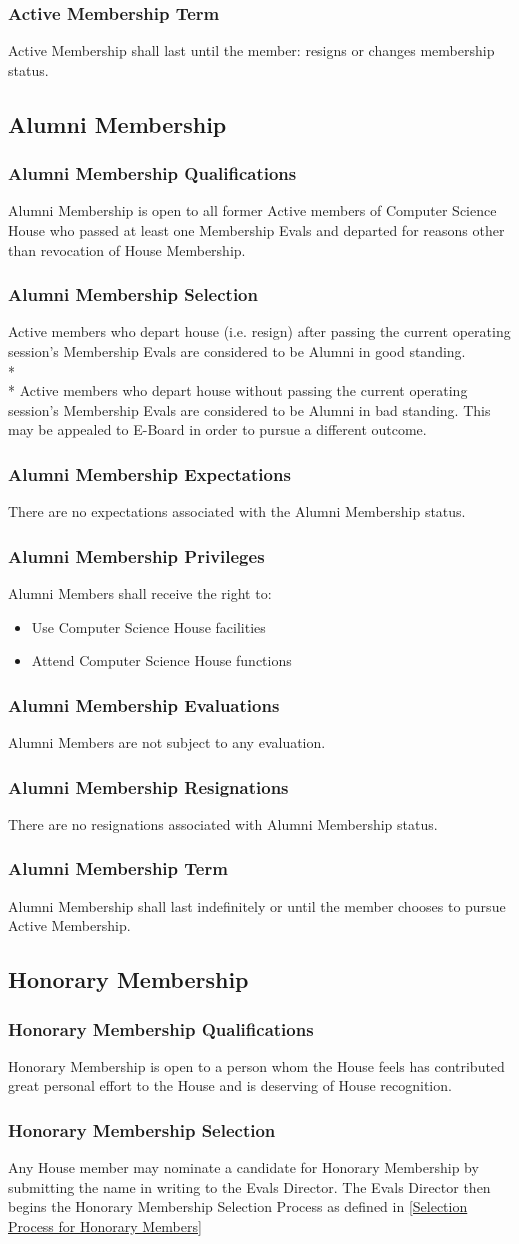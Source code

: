 \documentclass{article}
\newcommand{\asection}[1]{\subsection{#1} \label{#1}}
\newcommand{\asubsection}[1]{\subsubsection{#1} \label{#1}}
\begin{document}
\asubsection{Active Membership Term}
Active Membership shall last until the member: resigns or changes membership status.

\asection{Alumni Membership}

\asubsection{Alumni Membership Qualifications}
Alumni Membership is open to all former Active members of Computer Science House who passed at least one Membership Evals and departed for reasons other than revocation of House Membership.

\asubsection{Alumni Membership Selection}
Active members who depart house (i.e. resign) after passing the current operating session's Membership Evals are considered to be Alumni in good standing.
\\*\\*
Active members who depart house without passing the current operating session's Membership Evals are considered to be Alumni in bad standing.
This may be appealed to E-Board in order to pursue a different outcome.

\asubsection{Alumni Membership Expectations}
There are no expectations associated with the Alumni Membership status.

\asubsection{Alumni Membership Privileges}
Alumni Members shall receive the right to:
\begin{itemize}
	\item Use Computer Science House facilities
	\item Attend Computer Science House functions
\end{itemize}

\asubsection{Alumni Membership Evaluations}
Alumni Members are not subject to any evaluation.

\asubsection{Alumni Membership Resignations}
There are no resignations associated with Alumni Membership status.

\asubsection{Alumni Membership Term}
Alumni Membership shall last indefinitely or until the member chooses to pursue Active Membership.

\asection{Honorary Membership}

\asubsection{Honorary Membership Qualifications}
Honorary Membership is open to a person whom the House feels has contributed great personal effort to the House and is deserving of House recognition.

\asubsection{Honorary Membership Selection}
Any House member may nominate a candidate for Honorary Membership by submitting the name in writing to the Evals Director.
The Evals Director then begins the Honorary Membership Selection Process as defined in \ref{Selection Process for Honorary Members}
\end{document}
